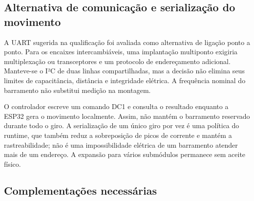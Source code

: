 \subsection{Alternativa de comunicação e serialização do movimento}
A UART sugerida na qualificação foi avaliada como alternativa de ligação ponto a ponto. Para os encaixes intercambiáveis, uma implantação multiponto exigiria multiplexação ou transceptores e um protocolo de endereçamento adicional. Manteve-se o I²C de duas linhas compartilhadas, mas a decisão não elimina seus limites de capacitância, distância e integridade elétrica. A frequência nominal do barramento não substitui medição na montagem. \cite{NXP_I2C}

O controlador escreve um comando DC1 e consulta o resultado enquanto a ESP32 gera o movimento localmente. Assim, não mantém o barramento reservado durante todo o giro. A serialização de um único giro por vez é uma política do runtime, que também reduz a sobreposição de picos de corrente e mantém a rastreabilidade; não é uma impossibilidade elétrica de um barramento atender mais de um endereço. A expansão para vários submódulos permanece sem aceite físico. 

\subsection*{\textcolor{DCPendente}{Complementações necessárias}}
